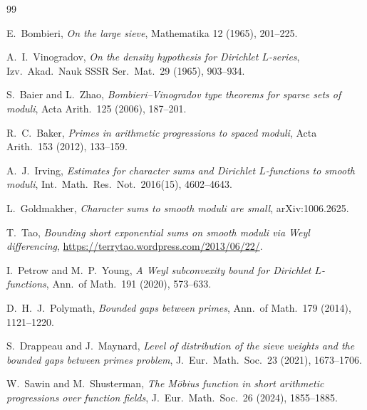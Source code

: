\documentclass[11pt]{article}
\begin{document}
\begin{thebibliography}{99}

E.~Bombieri, \emph{On the large sieve}, Mathematika 12 (1965), 201--225.

A.~I.~Vinogradov, \emph{On the density hypothesis for Dirichlet $L$-series},
Izv.\ Akad.\ Nauk SSSR Ser.\ Mat.\ 29 (1965), 903--934.

S.~Baier and L.~Zhao, \emph{Bombieri--Vinogradov type theorems for sparse
sets of moduli}, Acta Arith.\ 125 (2006), 187--201.

R.~C.~Baker, \emph{Primes in arithmetic progressions to spaced moduli},
Acta Arith.\ 153 (2012), 133--159.

A.~J.~Irving, \emph{Estimates for character sums and Dirichlet
$L$-functions to smooth moduli}, Int.\ Math.\ Res.\ Not.\ 2016(15),
4602--4643.

L.~Goldmakher, \emph{Character sums to smooth moduli are small}, arXiv:1006.2625.

T.~Tao, \emph{Bounding short exponential sums on smooth moduli via
Weyl differencing}, \url{https://terrytao.wordpress.com/2013/06/22/}.

I.~Petrow and M.~P.~Young, \emph{A Weyl subconvexity bound for
Dirichlet $L$-functions}, Ann.\ of Math.\ 191 (2020), 573--633.


D.~H.~J.~Polymath, \emph{Bounded gaps between primes}, Ann.\ of Math.\
179 (2014), 1121--1220.

S.~Drappeau and J.~Maynard, \emph{Level of distribution of the sieve
weights and the bounded gaps between primes problem}, J.\ Eur.\ Math.\ Soc.\
23 (2021), 1673--1706.

W.~Sawin and M.~Shusterman, \emph{The M{\"o}bius function in short
arithmetic progressions over function fields}, J.\ Eur.\ Math.\ Soc.\
26 (2024), 1855--1885.

\end{thebibliography}
\end{document}
